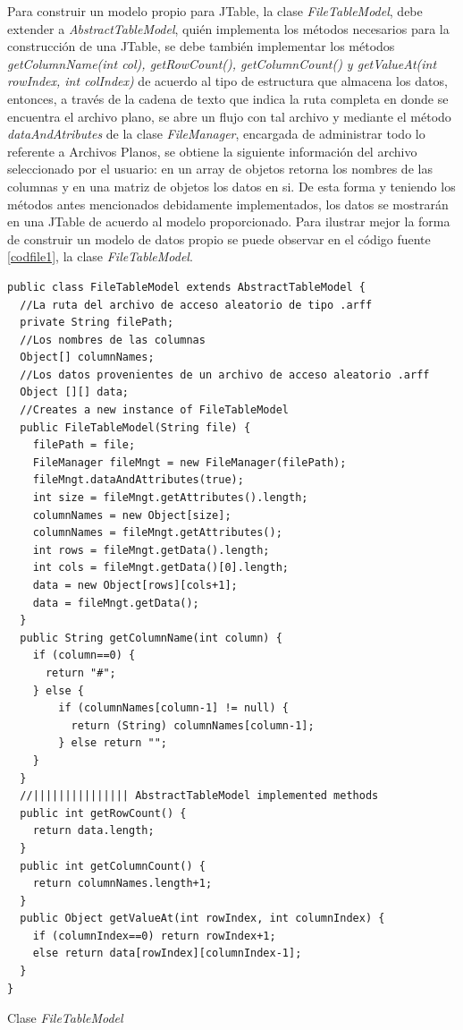 Para construir un modelo propio para JTable, la clase \textit{FileTableModel}, debe extender a
\textit{AbstractTableModel}, qui\'en implementa los m\'etodos necesarios para la construcci\'on de una JTable, se
debe tambi\'en implementar los m\'etodos \textit{getColumnName(int col), getRowCount(), getColumnCount() y
getValueAt(int rowIndex, int colIndex)} de acuerdo al  tipo de estructura que almacena los datos, entonces, a
trav\'es de la cadena de texto que indica la ruta completa en donde se encuentra el archivo plano, se abre un
flujo con tal archivo y mediante el m\'etodo \textit{dataAndAtributes} de la clase \textit{FileManager}, encargada
de administrar todo lo referente a Archivos Planos, se obtiene la siguiente informaci\'on del archivo seleccionado
por el usuario: en un array de objetos retorna los nombres de las columnas y en una matriz de objetos los datos en
si. De esta forma y teniendo los m\'etodos antes mencionados debidamente implementados, los datos se mostrar\'an
en una JTable de acuerdo al modelo proporcionado. Para ilustrar mejor la forma de construir un modelo de datos
propio se puede observar en el c\'odigo fuente \ref{codfile1}, la clase \textit{FileTableModel}.\\

\begin{codigof}[!h]
\fontsize{11.5}{12}
\begin{verbatim}
public class FileTableModel extends AbstractTableModel {
  //La ruta del archivo de acceso aleatorio de tipo .arff
  private String filePath;
  //Los nombres de las columnas
  Object[] columnNames;
  //Los datos provenientes de un archivo de acceso aleatorio .arff
  Object [][] data;
  //Creates a new instance of FileTableModel
  public FileTableModel(String file) {
    filePath = file;
    FileManager fileMngt = new FileManager(filePath);
    fileMngt.dataAndAttributes(true);
    int size = fileMngt.getAttributes().length;
    columnNames = new Object[size];
    columnNames = fileMngt.getAttributes();
    int rows = fileMngt.getData().length;
    int cols = fileMngt.getData()[0].length;
    data = new Object[rows][cols+1];
    data = fileMngt.getData();
  }
  public String getColumnName(int column) {
    if (column==0) {
      return "#";
    } else {
        if (columnNames[column-1] != null) {
          return (String) columnNames[column-1];
        } else return "";
    }
  }
  //||||||||||||||| AbstractTableModel implemented methods
  public int getRowCount() {
    return data.length;
  }
  public int getColumnCount() {
    return columnNames.length+1;
  }
  public Object getValueAt(int rowIndex, int columnIndex) {
    if (columnIndex==0) return rowIndex+1;
    else return data[rowIndex][columnIndex-1];
  }
}
\end{verbatim}
\caption{Clase \textit{FileTableModel}}
\label{codfile1}
\end{codigof}

